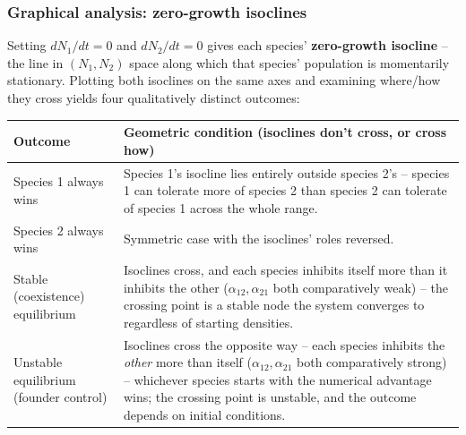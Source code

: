 \documentclass[11pt,a4paper]{article}
\begin{document}
\subsubsection*{Graphical analysis: zero-growth isoclines}
Setting $dN_1/dt = 0$ and $dN_2/dt = 0$ gives each species' \textbf{zero-growth isocline} -- the line in $(N_1,N_2)$ space along which that species' population is momentarily stationary. Plotting both isoclines on the same axes and examining where/how they cross yields four qualitatively distinct outcomes:

\begin{center}
\begin{tabularx}{\textwidth}{@{}l X@{}}
\toprule
\textbf{Outcome} & \textbf{Geometric condition (isoclines don't cross, or cross how)} \\
\midrule
Species 1 always wins & Species 1's isocline lies entirely outside species 2's -- species 1 can tolerate more of species 2 than species 2 can tolerate of species 1 across the whole range. \\
Species 2 always wins & Symmetric case with the isoclines' roles reversed. \\
Stable (coexistence) equilibrium & Isoclines cross, and each species inhibits itself more than it inhibits the other ($\alpha_{12}, \alpha_{21}$ both comparatively weak) -- the crossing point is a stable node the system converges to regardless of starting densities. \\
Unstable equilibrium (founder control) & Isoclines cross the opposite way -- each species inhibits the \emph{other} more than itself ($\alpha_{12},\alpha_{21}$ both comparatively strong) -- whichever species starts with the numerical advantage wins; the crossing point is unstable, and the outcome depends on initial conditions. \\
\bottomrule
\end{tabularx}
\end{center}
\end{document}
